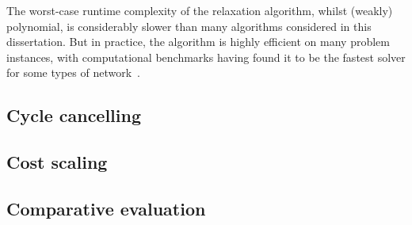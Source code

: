 The worst-case runtime complexity of the relaxation algorithm, whilst (weakly) polynomial, is considerably slower than many algorithms considered in this dissertation. But in practice, the algorithm is highly efficient on many problem instances, with computational benchmarks having found it to be the fastest solver for some types of network~\cite{KiralyKovacs:2012}.

\subsection{Cycle cancelling}


\subsection{Cost scaling}


\subsection{Comparative evaluation}

